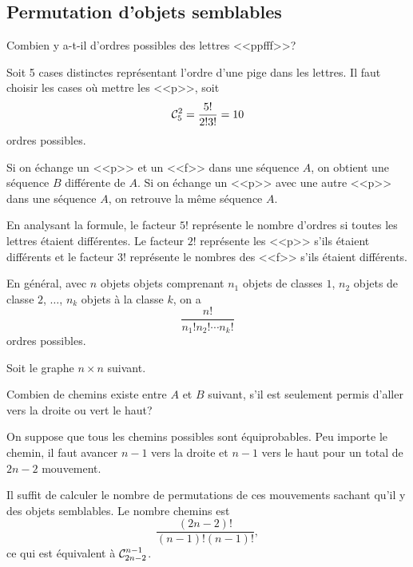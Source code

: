 \documentclass[11pt]{article}
\newcommand\comb[2]{%
	\ensuremath{%
		\mathcal{C}_{#2}^{#1}%
	}%
}%
\begin{document}
\subsection{Permutation d'objets semblables}
\begin{exemple}
	Combien y a-t-il d'ordres possibles des lettres <<ppfff>>?

	Soit 5 cases distinctes représentant l'ordre d'une pige dans les lettres.
	Il faut choisir les cases où mettre les <<p>>, soit
	\begin{equation*}
		\comb{2}{5}=\frac{5!}{2!3!}=10
	\end{equation*}
	ordres possibles.
	
	Si on échange un <<p>> et un <<f>> dans une séquence $A$, on obtient une
	séquence $B$ différente de $A$. Si on échange un <<p>> avec une autre <<p>>
	dans une séquence $A$, on retrouve la même séquence $A$.

	En analysant la formule, le facteur $5!$ représente le nombre d'ordres si
	toutes les lettres étaient différentes. Le facteur $2!$ représente les
	<<p>> s'ils étaient différents et le facteur $3!$ représente le nombres des
	<<f>> s'ils étaient différents.
\end{exemple}

En général, avec $n$ objets objets comprenant $n_1$ objets de classes $1$,
$n_2$ objets de classe $2$, $\dots$, $n_k$ objets à la classe $k$, on a
\begin{equation*}
	\frac{n!}{n_1!n_2!\cdots n_k!}
\end{equation*}
ordres possibles.

\begin{exemple}\label{ex:network}
	Soit le graphe $n\times n$ suivant.
	\begin{figure}[H]
		\vspace{-3mm}
		\centering
		
		\vspace{-3mm}
	\end{figure}

	Combien de chemins existe entre $A$ et $B$ suivant, s'il est seulement
	permis d'aller vers la droite ou vert le haut?
\end{exemple}
\addtocounter{exemple}{-1}
\begin{exemple}[suite]
	On suppose que tous les chemins possibles sont équiprobables. Peu importe
	le chemin, il faut avancer $n-1$ vers la droite et $n-1$ vers le haut pour
	un total de $2n-2$ mouvement.
	
	Il suffit de calculer le nombre de permutations de ces mouvements sachant
	qu'il y des objets semblables. Le nombre chemins est
	\begin{equation*}
		\frac{\left(2n-2\right)!}{\left(n-1\right)!\left(n-1\right)!},
	\end{equation*}
	ce qui est équivalent à $\comb{n-1}{2n-2}$.
\end{exemple}
\end{document}
